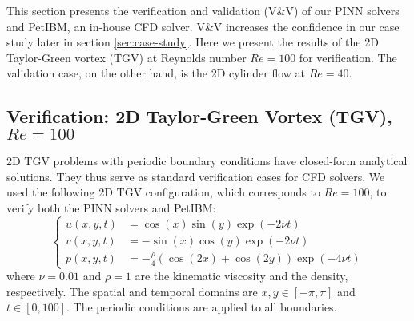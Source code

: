 
This section presents the verification and validation (V\&V) of our PINN solvers and PetIBM, an in-house CFD solver.
V\&V increases the confidence in our case study later in section \ref{sec:case-study}.
Here we present the results of the 2D Taylor-Green vortex (TGV) at Reynolds number $Re=\num{100}$ for verification.
The validation case, on the other hand, is the 2D cylinder flow at $Re=40$.

\subsection{Verification: 2D Taylor-Green Vortex (TGV), $Re=\num{100}$}\label{sec:verification}

2D TGV problems with periodic boundary conditions have closed-form analytical solutions.
They thus serve as standard verification cases for CFD solvers.
We used the following 2D TGV configuration, which corresponds to $Re=\num{100}$, to verify both the PINN solvers and PetIBM:
\begin{equation}\label{eq:tgv}
    \left\{
        \begin{aligned}
            u(x, y, t) &= \cos(x)\sin(y)\exp(-2 \nu t) \\
            v(x, y, t) &= - \sin(x)\cos(y)\exp(-2 \nu t) \\
            p(x, y, t) &= -\frac{\rho}{4}\left(\cos(2x) + \cos(2y)\right)\exp(-4 \nu t)
        \end{aligned}
    \right.
\end{equation}
where $\nu=\num{0.01}$ and $\rho=\num{1}$ are the kinematic viscosity and the density, respectively.
The spatial and temporal domains are $x, y \in \left[-\pi, \pi\right]$ and $t \in [0, 100]$.
The periodic conditions are applied to all boundaries.

